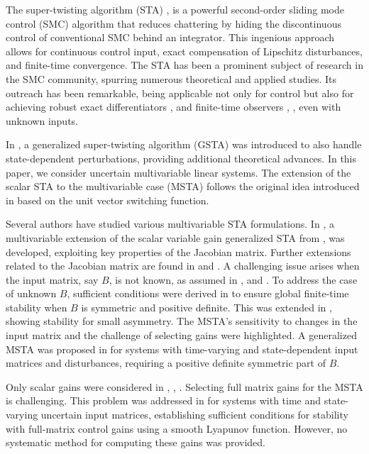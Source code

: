 \documentclass[twocolumn]{autarc_LH}
\begin{document}
The super-twisting algorithm (STA)  \cite{Levant:1993}, \cite{Shtessel_book:2014} is a powerful second-order sliding mode control (SMC) algorithm that reduces chattering by hiding the discontinuous control of conventional SMC \cite{U:92} behind an integrator. This ingenious approach allows for continuous control input, exact compensation of Lipschitz disturbances, and finite-time convergence. The STA has been a prominent subject of research in the SMC community, spurring numerous theoretical and applied studies. Its outreach has been remarkable, being applicable not only for control but also for achieving robust exact differentiators \cite{L:2003}, \cite{Levant2007}  and finite-time observers \cite{Davila2005}, \cite{Floquet2007}, even with unknown inputs.

In \cite{Moreno:2009}, a generalized super-twisting algorithm (GSTA) was introduced to also handle state-dependent perturbations, providing additional theoretical advances. In this paper, we consider uncertain multivariable linear systems. The extension of the scalar STA to the multivariable case (MSTA) follows the original idea introduced in \cite{NE:2014} based on the unit vector switching function.

Several authors have studied various multivariable STA formulations. In \cite{VNH_tac:2017}, a multivariable extension of the scalar variable gain generalized STA from \cite{GMF:2012}, was developed, exploiting key properties of the Jacobian matrix. Further extensions related to the Jacobian matrix are found in \cite{Caamal_Moreno:2019} and  \cite{MROF:2022}. A challenging issue arises when the input matrix, say $B$, is not known, as assumed in \cite{Caamal_Moreno:2019}, \cite{NE:2014} and \cite{VNH_tac:2017}. To address the case of unknown $B$, sufficient conditions were derived in \cite{VNH:2016} to ensure global finite-time stability when $B$ is symmetric and positive definite. This was extended in \cite{KNH:2019}, showing stability for small asymmetry. The MSTA’s sensitivity to changes in the input matrix and the challenge of selecting gains were highlighted. A generalized MSTA was proposed in \cite{MROF:2022} for systems with time-varying and state-dependent input matrices and disturbances, requiring a positive definite symmetric part of $B$.

Only scalar gains were considered in \cite{KNH:2019}, \cite{MROF:2022}, \cite{VNH:2016}. Selecting full matrix gains for the MSTA is challenging. This problem was addressed in \cite{MGM:2024} for systems with time and state-varying uncertain input matrices, establishing  sufficient conditions for stability with full-matrix control gains using a smooth Lyapunov function. However, no systematic method for computing these gains was provided.
\end{document}
